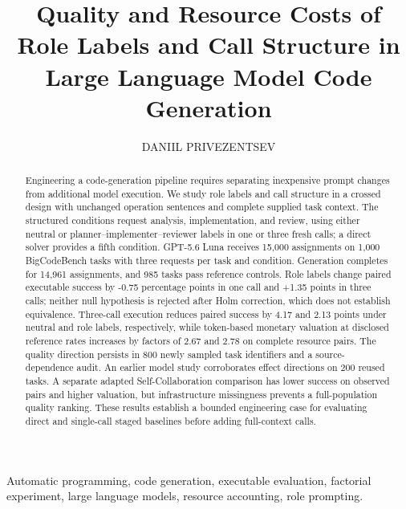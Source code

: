 \documentclass[nolineno]{ieeeaccess}
\begin{document}
\doi{}
\title{Quality and Resource Costs of Role Labels and Call Structure in Large Language Model Code Generation}
\author{\uppercase{Daniil Privezentsev}}
\address{National Research University Higher School of Economics, 20 Myasnitskaya Ulitsa, Moscow 101000, Russia (e-mail: daprivezentsev@edu.hse.ru)}
\begin{abstract}
Engineering a code-generation pipeline requires separating inexpensive prompt changes from additional model execution. We study role labels and call structure in a crossed design with unchanged operation sentences and complete supplied task context. The structured conditions request analysis, implementation, and review, using either neutral or planner--implementer--reviewer labels in one or three fresh calls; a direct solver provides a fifth condition. GPT-5.6 Luna receives 15,000 assignments on 1,000 BigCodeBench tasks with three requests per task and condition. Generation completes for 14,961 assignments, and 985 tasks pass reference controls. Role labels change paired executable success by -0.75 percentage points in one call and +1.35 points in three calls; neither null hypothesis is rejected after Holm correction, which does not establish equivalence. Three-call execution reduces paired success by 4.17 and 2.13 points under neutral and role labels, respectively, while token-based monetary valuation at disclosed reference rates increases by factors of 2.67 and 2.78 on complete resource pairs. The quality direction persists in 800 newly sampled task identifiers and a source-dependence audit. An earlier model study corroborates effect directions on 200 reused tasks. A separate adapted Self-Collaboration comparison has lower success on observed pairs and higher valuation, but infrastructure missingness prevents a full-population quality ranking. These results establish a bounded engineering case for evaluating direct and single-call staged baselines before adding full-context calls.
\end{abstract}
\begin{keywords}
Automatic programming, code generation, executable evaluation, factorial experiment, large language models, resource accounting, role prompting.
\end{keywords}
\end{document}

